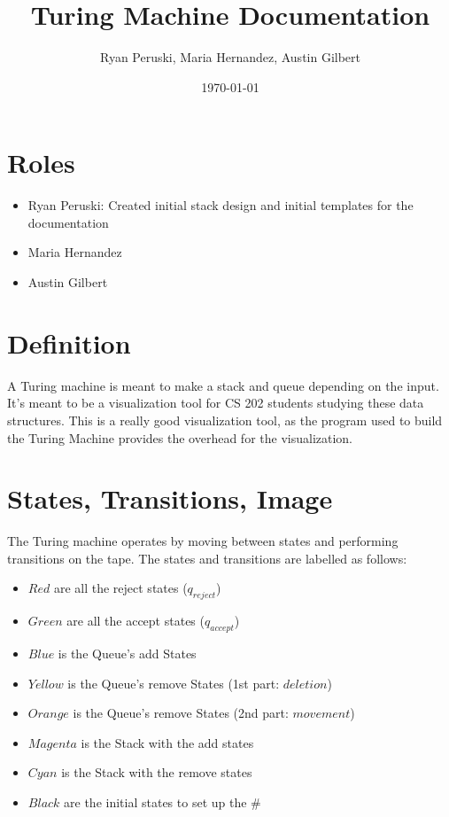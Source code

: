 \documentclass{article}
\title{Turing Machine Documentation}
\author{Ryan Peruski, Maria Hernandez, Austin Gilbert}
\date{\today}
\begin{document}
\maketitle
\section{Roles}

\begin{itemize}
    \item Ryan Peruski: Created initial stack design and initial templates for the documentation
    \item Maria Hernandez
    \item Austin Gilbert
\end{itemize}
\section{Definition}
A Turing machine is meant to make a stack and queue depending on the input. It's meant to be a visualization tool for CS 202 students
studying these data structures. This is a really good visualization tool, as the program used to build the Turing Machine provides the overhead for
the visualization.

\section{States, Transitions, Image}
The Turing machine operates by moving between states and performing transitions on the tape. The states and transitions are labelled as follows:

\begin{itemize}
    \item $Red$ are all the reject states ($q_{reject}$)
    \item $Green$ are all the accept states ($q_{accept}$)
    \item $Blue$ is the Queue's add States
    \item $Yellow$ is the Queue's remove States (1st part: $deletion$)
    \item $Orange$ is the Queue's remove States  (2nd part: $movement$)
    \item $Magenta$ is the Stack with the add states
    \item $Cyan$ is the Stack with the remove states
    \item $Black$ are the initial states to set up the $\#$
\end{itemize}
\end{document}
